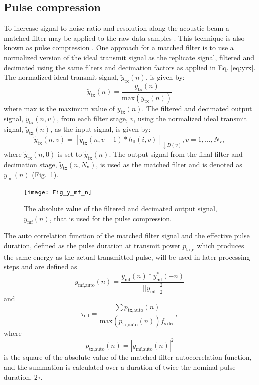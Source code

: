 \documentclass[preprint,12pt,TurnOnLineNumbers]{JASAnew}
\newcommand{\samplesymt}{n}
\newcommand{\genidxsym}{i}
\newcommand{\stagesym}{v}
\newcommand{\nstages}{N_{\textrm{v}}}
\newcommand{\fsdec}{f_{\textrm{s,dec}}}
\newcommand{\ptxe}{p_{\textrm{tx,e}}}
\newcommand{\tnom}{\tau}
\newcommand{\teff}{\tau_{\textrm{eff}}}
\newcommand{\ytx}{y_{\textrm{tx}}}
\newcommand{\ytxnorm}{\tilde{y}_{\textrm{tx}}}
\newcommand{\ymf}{y_{\textrm{mf}}}
\newcommand{\ymfauto}{y_{\textrm{mf,auto}}}
\newcommand{\ptxauto}{p_{\textrm{tx,auto}}}
\newcommand{\decfac}{D}
\newcommand{\hfl}{h_{\textrm{fl}}}
\begin{document}
\subsection{Pulse compression}
To increase signal-to-noise ratio and resolution along the acoustic beam a matched filter may be applied to the raw data samples \citep{turin1960}. This technique is also known as pulse compression \citep{klauder1960}. One approach for a matched filter is to use a normalized version of the ideal transmit signal as the replicate signal, filtered and decimated using the same filters and decimation factors as applied in Eq. \ref{eq:yrx}. The normalized ideal transmit signal, $\ytxnorm(\samplesymt)$, is given by:
%
\begin{equation}
\label{eq:ytxnorm}
\ytxnorm(\samplesymt) = \frac{\ytx(\samplesymt)}{\textrm{max}(\ytx(\samplesymt))}\end{equation}
%
where $\textrm{max}$ is the maximum value of $\ytx(\samplesymt)$. The filtered and decimated output signal, $\ytxnorm(\samplesymt,\stagesym)$, from each filter stage, $\stagesym$, using the normalized ideal transmit signal, $\ytxnorm(\samplesymt)$, as the input signal, is given by:
%
\begin{equation}
\label{eq:FilterStagesTX}
\ytxnorm(\samplesymt,\stagesym) = \left[ \ytxnorm(\samplesymt,\stagesym-1) * \hfl(\genidxsym,\stagesym) \right]_{\downarrow \decfac(\stagesym)}, 
\stagesym = 1,\ldots,\nstages,
\end{equation}
%
where $\ytxnorm(\samplesymt,0)$ is set to $\ytxnorm(\samplesymt)$. The output signal from the final filter and decimation stage, $\ytxnorm(\samplesymt,\nstages)$, is used as the matched filter and is denoted as $\ymf(\samplesymt)$  (Fig.~\ref{fi:y_mf_n}).
%
\begin{figure}
\texttt{[image: Fig\_y\_mf\_n]}
\caption{\label{fi:y_mf_n} The absolute value of the filtered and decimated output signal, $\ymf(\samplesymt)$, that is used for the pulse compression.}
\end{figure}

The auto correlation function of the matched filter signal and the effective pulse duration, defined as the pulse duration at transmit power $\ptxe$ which produces the same energy as the actual transmitted pulse, will be used in later processing steps and are defined as
\begin{equation}
\label{eq:TXAuto}
\ymfauto(\samplesymt) = \frac{\ymf(\samplesymt)*\ymf^*(-\samplesymt)}{||\ymf||^2_2}
\end{equation}
and
\begin{equation}
\label{eq:TauEff}
\teff = \frac{\sum \ptxauto(\samplesymt)}{\textrm{max}(\ptxauto(\samplesymt))\fsdec},
\end{equation}
where
\begin{equation*}
\ptxauto(\samplesymt)  =  |\ymfauto(\samplesymt)|^2
\end{equation*}
is the square of the absolute value of the matched filter autocorrelation function, and the summation is calculated over a duration of twice the nominal pulse duration, $2\tnom$.
\end{document}
